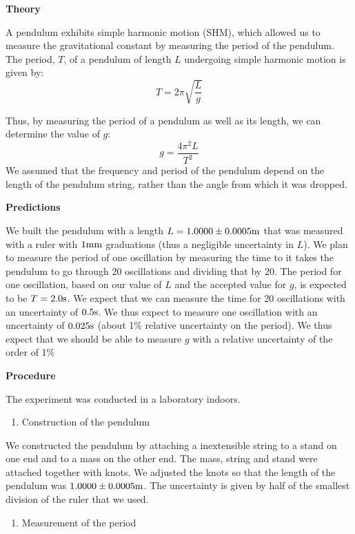 \textbf{Theory}

A pendulum exhibits simple harmonic motion (SHM), which allowed us to measure the gravitational constant by measuring the period of the pendulum. The period, $T$, of a pendulum of length $L$ undergoing simple harmonic motion is given by:
\begin{equation}
T=2\pi \sqrt {\frac{L}{g}}
\end{equation}

Thus, by measuring the period of a pendulum as well as its length, we can determine the value of $g$:
\begin{equation}
g=\frac{4\pi^{2}L}{T^{2}}
\end{equation}
We assumed that the frequency and period of the pendulum depend on the length of the pendulum string, rather than the angle from which it was dropped.

\textbf{Predictions}

We built the pendulum with a length $L=1.0000\pm 0.0005 {\rm m}$ that was measured with a ruler with $1 {\rm mm}$ graduations (thus a negligible uncertainty in $L$). We plan to measure the period of one oscillation by measuring the time to it takes the pendulum to go through 20 oscillations and dividing that by 20. The period for one oscillation, based on our value of $L$ and the accepted value for $g$, is expected to be $T=2.0 {\rm s}$. We expect that we can measure the time for 20 oscillations with an uncertainty of $0.5 {\rm s}$. We thus expect to measure one oscillation with an uncertainty of $0.025 {\rm s}$ (about 1\% relative uncertainty on the period). We thus expect that we should be able to measure $g$ with a relative uncertainty of the order of 1\%

\textbf{Procedure}

The experiment was conducted in a laboratory indoors.

\begin{enumerate}
\item Construction of the pendulum
\end{enumerate}

We constructed the pendulum by attaching a inextensible string to a stand on one end and to a mass on the other end. The mass, string and stand were attached together with knots. We adjusted the knots so that the length of the pendulum was $1.0000\pm0.0005 {\rm m}$. The uncertainty is given by half of the smallest division of the ruler that we used.

\begin{enumerate}[resume]
\item Measurement of the period
\end{enumerate}

